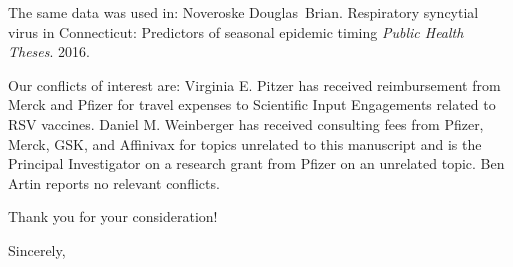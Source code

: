 \documentclass[10pt]{letter} %
\begin{document}
\begin{letter}{}
The same data was used in: Noveroske Douglas Brian. Respiratory syncytial virus in Connecticut: Predictors of seasonal epidemic timing \textit{Public Health Theses}. 2016.

Our conflicts of interest are: Virginia E. Pitzer has received reimbursement from Merck and Pfizer for travel expenses to Scientific Input Engagements related to RSV vaccines. Daniel M. Weinberger has received consulting fees from Pfizer, Merck, GSK, and Affinivax for topics unrelated to this manuscript and is the Principal Investigator on a research grant from Pfizer on an unrelated topic. Ben Artin reports no relevant conflicts.

Thank you for your consideration!

\vspace{2\parskip} %
\closing{Sincerely,}
\vspace{2\parskip} %


\end{letter}
 
\end{document}
